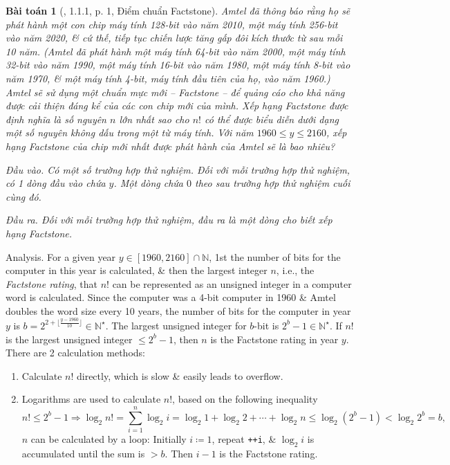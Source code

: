 \documentclass{article}
\newtheorem{baitoan}{Bài toán}
\begin{document}
\begin{baitoan}[\cite{Wu_Wang2018}, 1.1.1, p. 1, Điểm chuẩn Factstone]
	{\sc Amtel} đã thông báo rằng họ sẽ phát hành một con chip máy tính 128-bit vào năm 2010, một máy tính 256-bit vào năm 2020, \& cứ thế, tiếp tục chiến lược tăng gấp đôi kích thước từ sau mỗi 10 năm. ({\sc Amtel} đã phát hành một máy tính 64-bit vào năm 2000, một máy tính 32-bit vào năm 1990, một máy tính 16-bit vào năm 1980, một máy tính 8-bit vào năm 1970, \& một máy tính 4-bit, máy tính đầu tiên của họ, vào năm 1960.) {\sc Amtel} sẽ sử dụng một chuẩn mực mới -- {\rm Factstone} -- để quảng cáo cho khả năng được cải thiện đáng kể của các con chip mới của mình. Xếp hạng {\rm Factstone} được định nghĩa là số nguyên $n$ lớn nhất sao cho $n!$ có thể được biểu diễn dưới dạng một số nguyên không dấu trong một từ máy tính. Với năm $1960\le y\le2160$, xếp hạng {\rm Factstone} của chip mới nhất được phát hành của {\sc Amtel} sẽ là bao nhiêu?
	\item {\sf Đầu vào.} Có một số trường hợp thử nghiệm. Đối với mỗi trường hợp thử nghiệm, có 1 dòng đầu vào chứa $y$. Một dòng chứa $0$ theo sau trường hợp thử nghiệm cuối cùng đó.
	\item {\sf Đầu ra.} Đối với mỗi trường hợp thử nghiệm, đầu ra là một dòng cho biết xếp hạng Factstone.
\end{baitoan}
{\sf Analysis.} For a given year $y\in[1960,2160]\cap\mathbb{N}$, 1st the number of bits for the computer in this year is calculated, \& then the largest integer $n$, i.e., the {\it Factstone rating}, that $n!$ can be represented as an unsigned integer in a computer word is calculated. Since the computer was a 4-bit computer in 1960 \& {\sc Amtel} doubles the word size every 10 years, the number of bits for the computer in year $y$ is $b = 2^{2 + \lfloor\frac{y - 1960}{10}\rfloor}\in\mathbb{N}^\star$. The largest unsigned integer for $b$-bit is $2^b - 1\in\mathbb{N}^\star$. If $n!$ is the largest unsigned integer $\le 2^b - 1$, then $n$ is the Factstone rating in year $y$. There are 2 calculation methods:
\begin{enumerate}
	\item Calculate $n!$ directly, which is slow \& easily leads to overflow.
	\item Logarithms are used to calculate $n!$, based on the following inequality
	\begin{equation*}
		n!\le 2^b - 1\Rightarrow\log_2 n! = \sum_{i=1}^n \log_2 i = \log_2 1 + \log_2 2 + \cdots + \log_2 n\le\log_2 (2^b - 1) < \log_2 2^b = b,
	\end{equation*}
	$n$ can be calculated by a loop: Initially $i\coloneqq1$, repeat {\tt++i}, \& $\log_2 i$ is accumulated until the sum is $> b$. Then $i - 1$ is the Factstone rating.
\end{enumerate}
\end{document}
